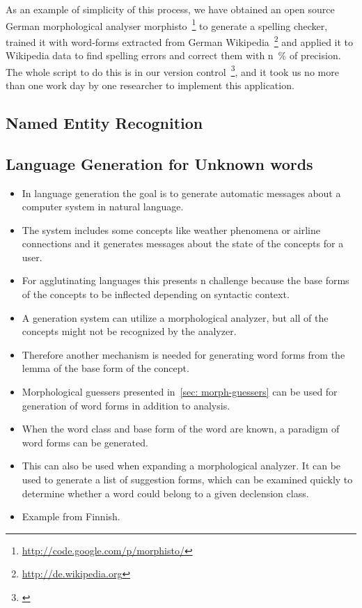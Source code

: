 \documentclass{llncs}
\begin{document}
As an example of simplicity of this process, we have obtained an open source
German morphological analyser
morphisto~\footnote{\url{http://code.google.com/p/morphisto/}} to generate a
spelling checker, trained it with word-forms extracted from German
Wikipedia~\footnote{\url{http://de.wikipedia.org}} and applied it to Wikipedia
data to find spelling errors and correct them with n~\% of precision. The whole
script to do this is in our version control~\footnote{\url{}}, and it took us
no more than one work day by one researcher to implement this application.

\subsection{Named Entity Recognition}

\subsection{Language Generation for Unknown words}
\begin{itemize}
\item In language generation the goal is to generate automatic
  messages about a computer system in natural language.
\item The system includes some concepts like weather phenomena or
  airline connections and it generates messages about the state of the
  concepts for a user.
\item For agglutinating languages this presents n challenge because
  the base forms of the concepts to be inflected depending on syntactic
  context.
\item A generation system can utilize a morphological analyzer, but
  all of the concepts might not be recognized by the analyzer.
\item Therefore another mechanism is needed for generating word forms
  from the lemma of the base form of the concept.
\item Morphological guessers presented in~\ref{sec: morph-guessers}
  can be used for generation of word forms in addition to analysis.
\item When the word class and base form of the word are known, a
  paradigm of word forms can be generated.
\item This can also be used when expanding a morphological
  analyzer. It can be used to generate a list of suggestion forms,
  which can be examined quickly to determine whether a word could
  belong to a given declension class.
\item Example from Finnish.
\end{itemize}
\end{document}
